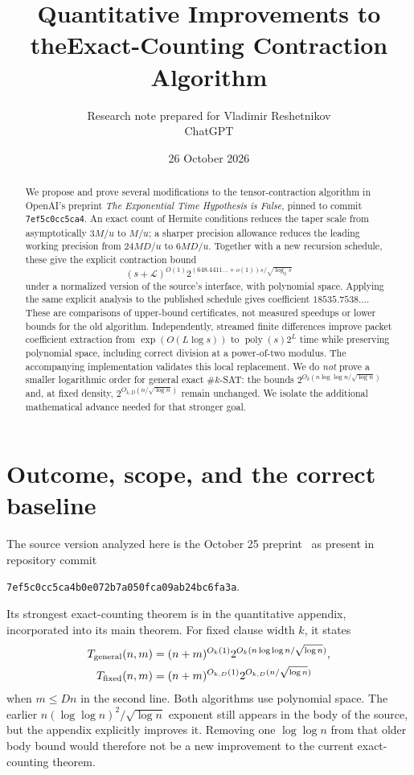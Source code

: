 \documentclass[11pt]{article}
\title{Quantitative Improvements to the\newline Exact-Counting Contraction Algorithm}
\author{Research note prepared for Vladimir Reshetnikov\\\small ChatGPT}
\date{26 October 2026}
\theoremstyle{remark}
\newcommand{\poly}{\operatorname{poly}}
\newcommand{\LL}{\mathcal L}
\begin{document}
\maketitle
\begin{abstract}
We propose and prove several modifications to the tensor-contraction algorithm in OpenAI's preprint \emph{The Exponential Time Hypothesis is False}, pinned to commit \texttt{7ef5c0cc5ca4}. An exact count of Hermite conditions reduces the taper scale from asymptotically $3M/u$ to $M/u$; a sharper precision allowance reduces the leading working precision from $24MD/u$ to $6MD/u$. Together with a new recursion schedule, these give the explicit contraction bound
\[
 (s+\LL)^{O(1)}2^{(648.4411\ldots+o(1))s/\sqrt{\log_2s}}
\]
under a normalized version of the source's interface, with polynomial space. Applying the same explicit analysis to the published schedule gives coefficient $18535.7538\ldots$. These are comparisons of upper-bound certificates, not measured speedups or lower bounds for the old algorithm. Independently, streamed finite differences improve packet coefficient extraction from $\exp(O(L\log s))$ to $\poly(s)2^L$ time while preserving polynomial space, including correct division at a power-of-two modulus. The accompanying implementation validates this local replacement. We do \emph{not} prove a smaller logarithmic order for general exact $\#k$-SAT: the bounds $2^{O_k(n\log\log n/\sqrt{\log n})}$ and, at fixed density, $2^{O_{k,D}(n/\sqrt{\log n})}$ remain unchanged. We isolate the additional mathematical advance needed for that stronger goal.
\end{abstract}
\tableofcontents

\section{Outcome, scope, and the correct baseline}
\label{sec:scope}

The source version analyzed here is the October 25 preprint~\cite{source} as present in repository commit
\begin{center}
\texttt{7ef5c0cc5ca4b0e072b7a050fca09ab24bc6fa3a}.
\end{center}
Its strongest exact-counting theorem is in the quantitative appendix, incorporated into its main theorem. For fixed clause width $k$, it states
\begin{align}
 T_{\rm general}(n,m)&=(n+m)^{O_k(1)}
   2^{O_k(n\log\log n/\sqrt{\log n})},\label{eq:general}\\
 T_{\rm fixed}(n,m)&=(n+m)^{O_{k,D}(1)}
   2^{O_{k,D}(n/\sqrt{\log n})}\label{eq:fixed}
\end{align}
when $m\le Dn$ in the second line. Both algorithms use polynomial space. The earlier $n(\log\log n)^2/\sqrt{\log n}$ exponent still appears in the body of the source, but the appendix explicitly improves it. Removing one $\log\log n$ from that older body bound would therefore not be a new improvement to the current exact-counting theorem.
\end{document}
